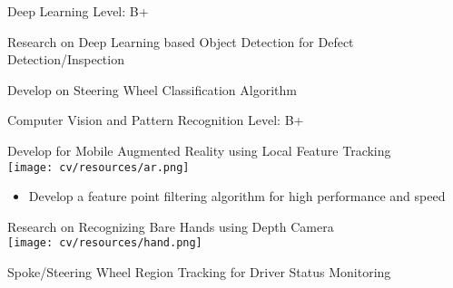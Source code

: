 


\begin{cventries}
  \cventry
    {Deep Learning} %
    {} %
    {} %
    {Level: B+} %
    {
      \begin{cvitems} %
        \item {Research on Deep Learning based Object Detection for Defect Detection/Inspection}
        \item {Develop on Steering Wheel Classification Algorithm}
      \end{cvitems}
    }

  \cventry
    {Computer Vision and Pattern Recognition} %
    {} %
    {} %
    {Level: B+} %
    {
      \begin{cvitems} %
        \item {Develop for Mobile Augmented Reality using Local Feature Tracking \\
               \texttt{[image: cv/resources/ar.png]} }
          \begin{itemize}
            \item {Develop a feature point filtering algorithm for high performance and speed}
          \end{itemize}
        \item {Research on Recognizing Bare Hands using Depth Camera \\
               \texttt{[image: cv/resources/hand.png]} }
        \item {Spoke/Steering Wheel Region Tracking for Driver Status Monitoring}
      \end{cvitems}
    }


\end{cventries}
